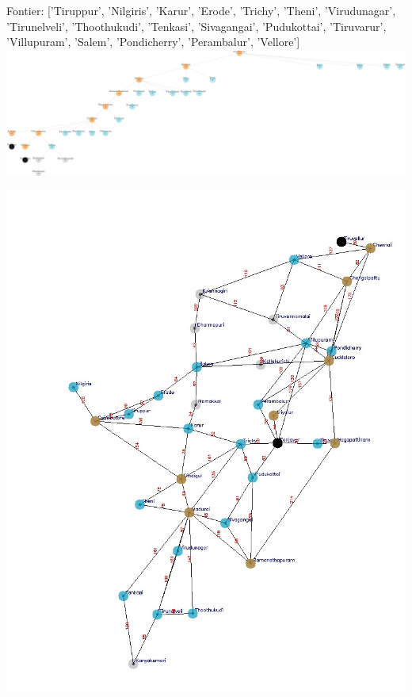 \documentclass[xcolor=table]{beamer}
\begin{document}
\begin{frame}
  { \tiny Fontier: ['Tiruppur', 'Nilgiris', 'Karur', 'Erode', 'Trichy', 'Theni', 'Virudunagar', 'Tirunelveli', 'Thoothukudi', 'Tenkasi', 'Sivagangai', 'Pudukottai', 'Tiruvarur', 'Villupuram', 'Salem', 'Pondicherry', 'Perambalur', 'Vellore'] }
  \includegraphics[width=1\textwidth]{../DFSNodes/15-1.png}
  \begin{center}
    \includegraphics[height=0.45\textheight]{../DFSoutput/tamilDFS13.jpg}
  \end{center}
\end{frame}
\end{document}
